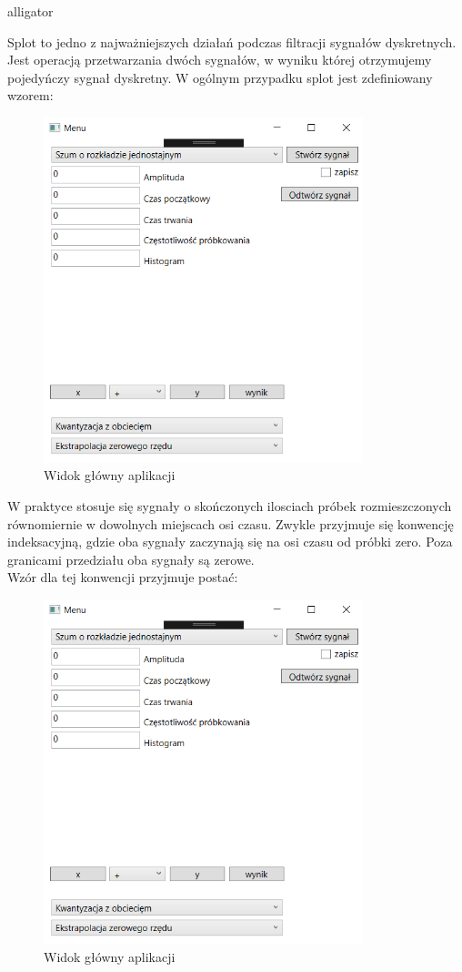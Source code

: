\documentclass[12pt]{article}
\begin{document}
\begin{labeling}{alligator}
\item [Splot] to jedno z najważniejszych działań podczas filtracji sygnałów dyskretnych. Jest operacją przetwarzania dwóch sygnałów, w wyniku której otrzymujemy pojedyńczy sygnał dyskretny.  W ogólnym przypadku splot jest zdefiniowany wzorem:
\begin{figure}[h!]
 \centering
 \includegraphics[width=9.3cm]{ui1.PNG}
 \vspace{-0.3cm}
 \caption{Widok główny aplikacji}
 \label{Widok_aplikacjis}
\end{figure}
W praktyce stosuje się sygnały o skończonych ilosciach próbek rozmieszczonych równomiernie w dowolnych miejscach osi czasu. Zwykle przyjmuje się konwencję indeksacyjną, gdzie oba sygnały zaczynają się  na osi czasu od próbki zero. Poza granicami przedziału oba sygnały są zerowe. 
\\Wzór dla tej konwencji przyjmuje postać: 
\begin{figure}[h!]
 \centering
 \includegraphics[width=9.3cm]{ui1.PNG}
 \vspace{-0.3cm}
 \caption{Widok główny aplikacji}
 \label{Widok_aplikacjis}
\end{figure}


\end{labeling}
\end{document}
